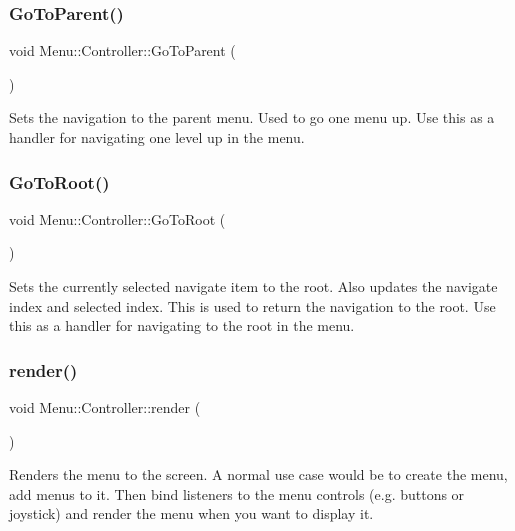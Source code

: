 \subsubsection{\texorpdfstring{Go\+To\+Parent()}{GoToParent()}}
{\footnotesize\ttfamily void Menu\+::\+Controller\+::\+Go\+To\+Parent (\begin{DoxyParamCaption}{ }\end{DoxyParamCaption})}

Sets the navigation to the parent menu. Used to go one menu up. Use this as a handler for navigating one level up in the menu. \hypertarget{class_menu_1_1_controller_a787911ef46ca1968c2fd667af1f9ac27}{}\label{class_menu_1_1_controller_a787911ef46ca1968c2fd667af1f9ac27} 
\subsubsection{\texorpdfstring{Go\+To\+Root()}{GoToRoot()}}
{\footnotesize\ttfamily void Menu\+::\+Controller\+::\+Go\+To\+Root (\begin{DoxyParamCaption}{ }\end{DoxyParamCaption})}

Sets the currently selected navigate item to the root. Also updates the navigate index and selected index. This is used to return the navigation to the root. Use this as a handler for navigating to the root in the menu. \hypertarget{class_menu_1_1_controller_ac35f61a344381d3420cae49e2fec829d}{}\label{class_menu_1_1_controller_ac35f61a344381d3420cae49e2fec829d} 
\subsubsection{\texorpdfstring{render()}{render()}}
{\footnotesize\ttfamily void Menu\+::\+Controller\+::render (\begin{DoxyParamCaption}{ }\end{DoxyParamCaption})}

Renders the menu to the screen. A normal use case would be to create the menu, add menus to it. Then bind listeners to the menu controls (e.\+g. buttons or joystick) and render the menu when you want to display it. \hypertarget{class_menu_1_1_controller_a9aabc6ba652c29efa7a02e12f51ce0b1}{}\label{class_menu_1_1_controller_a9aabc6ba652c29efa7a02e12f51ce0b1} 
